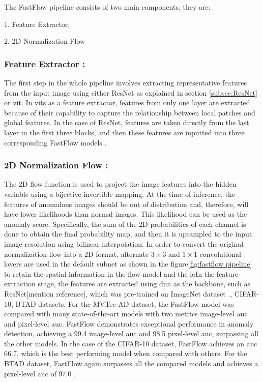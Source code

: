 The FastFlow pipeline consists of two main components, they are:

1. Feature Extractor,

2. 2D Normalization Flow

\subsubsection*{Feature Extractor :}

The first step in the whole pipeline involves extracting representative features from the input image using either ResNet as explained in section \ref{subsec:ResNet} or \gls{vit}. In \glspl{vit} as a feature extractor, features from only one layer are extracted because of their capability to capture the relationship between local patches and global features. In the case of ResNet, features are taken directly from the last layer in the first three blocks, and then these features are inputted into three corresponding FastFlow models \cite{yu2021fastflowunsupervisedanomalydetection}. 

\subsubsection*{2D Normalization Flow :}

The 2D flow function is used to project the image features into the hidden variable using a bijective invertible mapping. At the time of inference, the features of anomalous images should be out of distribution and, therefore, will have lower likelihoods than normal images. This likelihood can be used as the anomaly score. Specifically, the sum of the 2D probabilities of each channel is done to obtain the final probability map, and then it is upsampled to the input image resolution using bilinear interpolation. In order to convert the original normalization flow into a 2D format, alternate $3\times3$ and $1\times1$ convolutional layers are used in the default subnet as shown in the figure\ref{fig:fastflow pipeline} to retain the spatial information in the flow model and the loIn the feature extraction stage, the features are extracted using \gls{dnn} as the backbone, such as ResNet[mention reference], which was pre-trained on ImageNet\cite{5206848} dataset \cite{10208786}., CIFAR-10\cite{krizhevsky2009learning}, BTAD\cite{Mishra_2021} datasets. For the MVTec AD dataset, the FastFlow model was compared with many state-of-the-art models with two metrics image-level \gls{auc} and pixel-level \gls{auc}. FastFlow demonstrates exceptional performance in anomaly detection, achieving a 99.4 image-level \gls{auc} and 98.5 pixel-level \gls{auc}, surpassing all the other models. In the case of the CIFAR-10 dataset, FastFlow achieves an \gls{auc} 66.7, which is the best performing model when compared with others. For the BTAD dataset, FastFlow again surpasses all the compared models and achieves a pixel-level \gls{auc} of 97.0 \cite{yu2021fastflowunsupervisedanomalydetection}.

